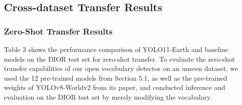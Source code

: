 \documentclass{article}
\begin{document}
\subsection{Cross-dataset Transfer Results}
\subsubsection{Zero-Shot Transfer Results}
Table 3 shows the performance comparison of YOLO11-Earth and baseline models on the DIOR test set for zero-shot 
transfer. To evaluate the zero-shot transfer capabilities of our open vocabulary detector on an unseen dataset, 
we used the 12 pre-trained models from Section 5.1, as well as the pre-trained weights of YOLOv8-Worldv2 from its 
paper, and conducted inference and evaluation on the DIOR test set by merely modifying the vocabulary.
\end{document}
